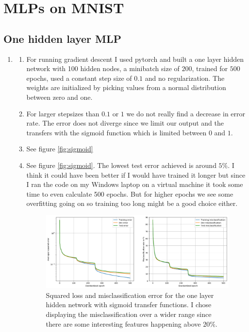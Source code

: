 \documentclass[12pt]{article}
\begin{document}
\section{MLPs on MNIST}

\subsection{One hidden layer MLP}

\begin{enumerate}
	\item
	\begin{enumerate}[label=(\alph*)]
		\item 
		For running gradient descent I used pytorch and built a one layer hidden network with 100 hidden nodes, a minibatch size of $200$, trained for $500$ epochs, used a constant step size of $0.1$ and no regularization. The weights are initialized by picking values from a normal distribution between zero and one. 	
		\item 
		For larger stepsizes than $0.1$ or $1$ we do not really find a decrease in error rate. The error does not diverge since we limit our output and the transfers with the sigmoid function which is limited between $0$ and $1$. 	
		\item See figure \ref{fig:sigmoid}
		\item See figure \ref{fig:sigmoid}. The lowest test error achieved is around $5\%$. I think it could have been better if I would have trained it longer but since I ran the code on my Windows laptop on a virtual machine it took some time to even calculate 500 epochs. But for higher epochs we see some overfitting going on so training too long might be a good choice either. 
		\begin{figure}[h]
			\centering
			\includegraphics[width=\linewidth]{./Problem_3/Problem_3.1_0.1_500_sigm.png}
			\caption{Squared loss and misclassification error for the one layer hidden network with sigmoid transfer functions. I chose displaying the misclassification over a wider range since there are some interesting features happening above $20\%$.}

\end{figure}
\end{enumerate}
\end{enumerate}
\end{document}
